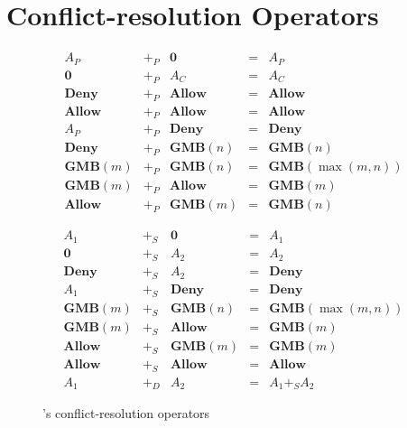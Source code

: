 \section{Conflict-resolution Operators}
\label{sec:conflict-resolution-operators}

\begin{figure}[t]

\begin{displaymath}
\begin{array}{lclcl}
A_P & +_P & \textbf{0} & = & A_P \\
\textbf{0} & +_P & A_C & = & A_C \\
\textbf{Deny} & +_P & \textbf{Allow} & = & \textbf{Allow} \\
\textbf{Allow} & +_P & \textbf{Allow} & = & \textbf{Allow} \\
A_P & +_P & \textbf{Deny} & = & \textbf{Deny} \\
\textbf{Deny} & +_P & \textbf{GMB}(n) & = & \textbf{GMB}(n) \\
\textbf{GMB}(m) & +_P & \textbf{GMB}(n) & = & \textbf{GMB}(\max(m,n)) \\
\textbf{GMB}(m) & +_P & \textbf{Allow} & = & \textbf{GMB}(m) \\
\textbf{Allow} & +_P & \textbf{GMB}(m) & = & \textbf{GMB}(n)
\end{array}
\end{displaymath}

\begin{displaymath}
\begin{array}{lclcl}
A_1 & +_S & \textbf{0} & = & A_1 \\
\textbf{0} & +_S & A_2 & = & A_2 \\
\textbf{Deny} & +_S & A_2 & = & \textbf{Deny} \\
A_1 & +_S & \textbf{Deny} & = & \textbf{Deny} \\
\textbf{GMB}(m) & +_S & \textbf{GMB}(n) & = & \textbf{GMB}(\max(m,n)) \\
\textbf{GMB}(m) & +_S & \textbf{Allow} & = & \textbf{GMB}(m) \\
\textbf{Allow} & +_S & \textbf{GMB}(m) & = & \textbf{GMB}(m) \\
\textbf{Allow} & +_S & \textbf{Allow} & = & \textbf{Allow} \\
A_1 & +_D & A_2 & = & A_1 +_S A_2 
\end{array}
\end{displaymath}

\caption{\sys's conflict-resolution operators}
\label{f:sysconflicts}

\end{figure}

